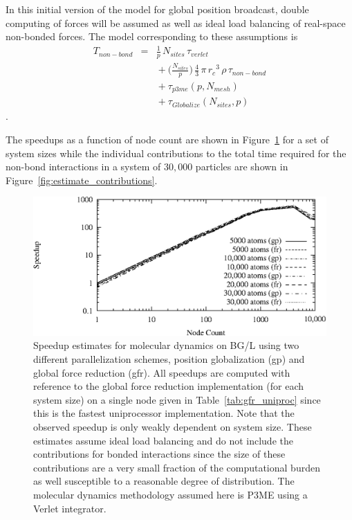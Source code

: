 \documentclass[doublespacing]{elsart}
\newcommand{\verlettime}{\ensuremath{\tau_{verlet}}}
\newcommand{\sitecount}{\ensuremath{{N_{sites}}}}
\newcommand{\rcutoff}{\ensuremath{r_{c}}}
\newcommand{\density}{\ensuremath{\rho}}
\newcommand{\nonbondtime}{\ensuremath{\tau_{non-bond}}}
\newcommand{\nodecount}{\ensuremath{p}}
\newcommand{\globalizepostime}{\ensuremath{\tau_{Globalize}(\sitecount, \nodecount)}}
\newcommand{\meshsize}[1]{\ensuremath{N_{#1}}}
\newcommand{\pmetime}{\ensuremath{\tau_{p3me}(\nodecount,\meshsize{mesh})}}
\begin{document}
In this initial version of the model for global position broadcast,
double computing of forces will be assumed as well as ideal load
balancing of real-space non-bonded forces.  The model corresponding to
these assumptions is
\begin{eqnarray}
T_{non-bond} & = & \frac{1}{\nodecount}\,\sitecount\,\verlettime \nonumber \\
       &   & \mbox{} +
       \big(\frac{\sitecount}{\nodecount}\big)\,\frac{4}{3}\,\pi\,\rcutoff^3\,\density\,\nonbondtime
       \nonumber \\
       &   & \mbox{} + \pmetime \nonumber \\
       &   & \mbox{} + \globalizepostime \nonumber
\end{eqnarray}.

The speedups as a function of node count are shown in
Figure~\ref{fig:estimate_speedup} for a set of system sizes while the
individual contributions to the total time required for the non-bond
interactions in a system of $30,000$ particles are shown in
Figure~\ref{fig:estimate_contributions}.

\begin{figure}
\begin{center}
\includegraphics[keepaspectratio, width=\textwidth]{estimate_speedup}
\caption{Speedup estimates for molecular dynamics on BG/L using two
different parallelization schemes, position globalization (gp) and
global force reduction (gfr). All speedups are computed with reference
to the global force reduction implementation (for each system size) on
a single node given in Table~\ref{tab:gfr_uniproc} since this is the
fastest uniprocessor implementation. Note that the observed speedup is
only weakly dependent on system size.
These estimates assume ideal load balancing and do not include the
contributions for bonded interactions since the size of these
contributions are a very small fraction of the computational burden as
well susceptible to a reasonable degree of distribution.  The
molecular dynamics methodology assumed here is P3ME using a Verlet
integrator.}
\label{fig:estimate_speedup}
\end{center}
\end{figure}
\end{document}
